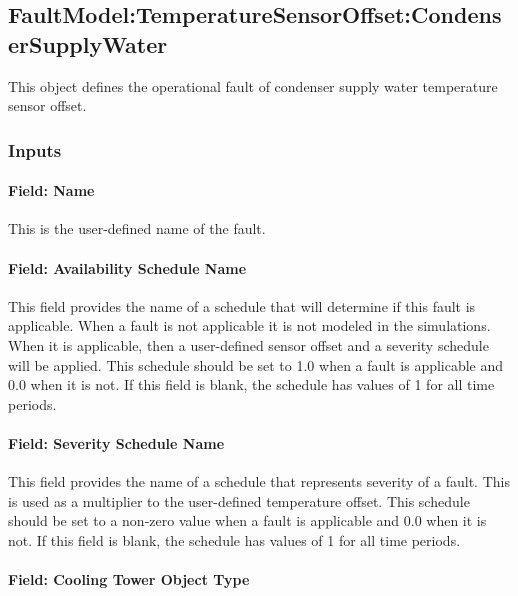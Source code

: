 \subsection{FaultModel:TemperatureSensorOffset:CondenserSupplyWater}\label{faultmodeltemperaturesensoroffsetcondensersupplywater}

This object defines the operational fault of condenser supply water temperature sensor offset.

\subsubsection{Inputs}

\paragraph{Field: Name}

This is the user-defined name of the fault.

\paragraph{Field: Availability Schedule Name}

This field provides the name of a schedule that will determine if this fault is applicable. When a fault is not applicable it is not modeled in the simulations. When it is applicable, then a user-defined sensor offset and a severity schedule will be applied. This schedule should be set to 1.0 when a fault is applicable and 0.0 when it is not. If this field is blank, the schedule has values of 1 for all time periods.

\paragraph{Field: Severity Schedule Name}\label{field-severity-schedule-name}

This field provides the name of a schedule that represents severity of a fault. This is used as a multiplier to the user-defined temperature offset. This schedule should be set to a non-zero value when a fault is applicable and 0.0 when it is not. If this field is blank, the schedule has values of 1 for all time periods.

\paragraph{Field: Cooling Tower Object Type}\label{field-tower-object-type}

